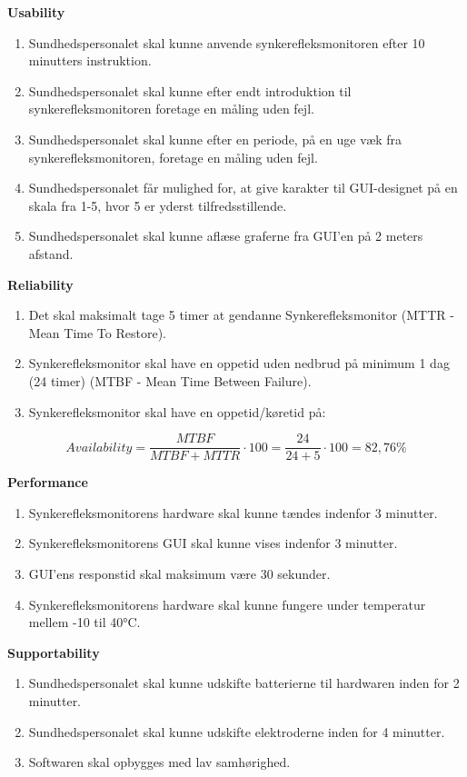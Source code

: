 \textbf{Usability}
\begin{enumerate}
\item Sundhedspersonalet skal kunne anvende synkerefleksmonitoren efter 10 minutters instruktion. 
\item Sundhedspersonalet skal kunne efter endt introduktion til synkerefleksmonitoren foretage en måling uden fejl.
\item Sundhedspersonalet skal kunne efter en periode, på en uge væk fra synkerefleksmonitoren, foretage en måling uden fejl.
\item Sundhedspersonalet får mulighed for, at give karakter til GUI-designet på en skala fra 1-5, hvor 5 er yderst tilfredsstillende.
\item Sundhedspersonalet skal kunne aflæse graferne fra GUI'en på 2 meters afstand. 
\end{enumerate}
                                                                                                
\textbf{Reliability}
\begin{enumerate}[resume]
\item Det skal maksimalt tage 5 timer at gendanne Synkerefleksmonitor (MTTR - Mean Time To Restore).
\item Synkerefleksmonitor skal have en oppetid uden nedbrud på minimum 1 dag (24 timer) (MTBF - Mean Time Between Failure).  
\item Synkerefleksmonitor skal have en oppetid/køretid på: 

\end{enumerate}


\begin{equation}
Availability = \frac{MTBF}{MTBF+MTTR}\cdot100 = \frac{24}{24+5}\cdot100 = 82,76 \%
\end{equation}

					
\textbf{Performance}
\begin{enumerate}[resume]
\item Synkerefleksmonitorens hardware skal kunne tændes indenfor 3 minutter.
\item Synkerefleksmonitorens GUI skal kunne vises indenfor 3 minutter.
\item GUI'ens responstid skal maksimum være 30 sekunder.
\item Synkerefleksmonitorens hardware skal kunne fungere under temperatur mellem  -10  til   \ang{40}C.

\end{enumerate}

\pagebreak
\textbf{Supportability}
\begin{enumerate}[resume]
\item Sundhedspersonalet skal kunne udskifte batterierne til hardwaren inden for 2 minutter.
\item Sundhedspersonalet skal kunne udskifte elektroderne inden for 4 minutter.
\item Softwaren skal opbygges med lav samhørighed.
\end{enumerate}

\newpage

\newpage
\listoffigures
\newpage
\listoftables

